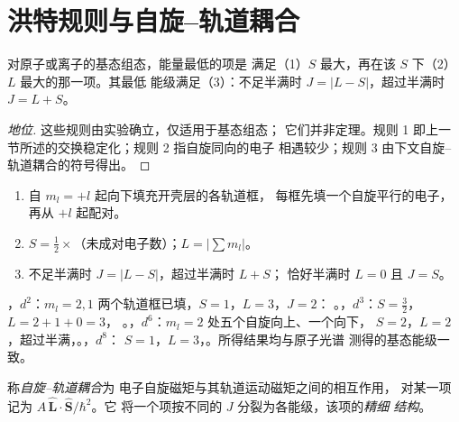 \section{洪特规则与自旋–轨道耦合}

\begin{proposition}[项的洪特规则]\label{prop:b3:many-electron-atoms:hund-terms}
对原子或离子的基态组态，能量最低的项是
满足（1）$S$ 最大，再在该 $S$ 下（2）$L$ 最大的那一项。其最低
能级满足（3）：不足半满时 $J = |L - S|$，超过半满时 $J = L +
S$。
\end{proposition}
\begin{proof}[地位]
这些规则由实验确立，仅适用于基态组态；
它们并非定理。规则 1 即上一
节所述的交换稳定化；规则 2 指自旋同向的电子
相遇较少；规则 3 由下文自旋–轨道耦合的符号得出。
\end{proof}

\begin{method}[由轨道框图求基态项]\label{met:b3:many-electron-atoms:ground-term}
\begin{enumerate}
  \item 自 $m_l = +l$ 起向下填充开壳层的各轨道框，
        每框先填一个自旋平行的电子，再从 $+l$ 起配对。
  \item $S = \frac12 \times$（未成对电子数）；$L = |\sum m_l|$。
  \item 不足半满时 $J = |L - S|$，超过半满时 $L + S$；
        恰好半满时 $L = 0$ 且 $J = S$。
\end{enumerate}
\end{method}

\begin{example}[基态项]\label{ex:b3:many-electron-atoms:ground-terms}
，$d^2$：$m_l = 2, 1$ 两个轨道框已填，$S = 1$，$L = 3$，$J = 2$：
。，$d^3$：$S = \frac32$，$L = 2 + 1 + 0 = 3$，
。，$d^6$：$m_l = 2$ 处五个自旋向上、一个向下，
$S = 2$，$L = 2$，超过半满，。，$d^8$：
$S = 1$，$L = 3$，。所得结果均与原子光谱
测得的基态能级一致。
\end{example}

\begin{definition}\label{def:b3:many-electron-atoms:spin-orbit}
称\emph{自旋–轨道耦合}为
电子自旋磁矩与其轨道运动磁矩之间的相互作用，
对某一项记为 $A\,\hat{\mathbf L}\cdot\hat{\mathbf S}/\hbar^2$。它
将一个项按不同的 $J$ 分裂为各能级，该项的\emph{精细
结构}。
\end{definition}

